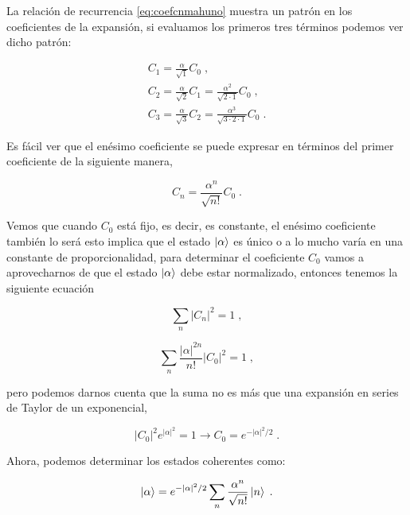     La relación de recurrencia \ref{eq:coefcnmahuno} muestra un patrón en los coeficientes de la expansión, si evaluamos los primeros tres términos podemos ver dicho patrón:

    \begin{align*}
        C_1 = \frac{\alpha}{\sqrt{1}}C_0\;,\\
        C_2 = \frac{\alpha}{\sqrt{2}}C_1 = \frac{\alpha^2}{\sqrt{2\cdot 1}}C_0\;,\\
        C_3 = \frac{\alpha}{\sqrt{3}}C_2 = \frac{\alpha^3}{\sqrt{3\cdot 2\cdot 1}}C_0\;.
    \end{align*}

    Es fácil ver que el enésimo coeficiente se puede expresar en términos del primer coeficiente de la siguiente manera,

    \begin{equation}
        C_n = \frac{\alpha^n}{\sqrt{n!}}C_0\;.
    \end{equation}

    Vemos que cuando $C_0$ está fijo, es decir, es constante, el enésimo coeficiente también lo será esto implica que el estado $\ket{\alpha}$ es único o a lo mucho varía en una constante de proporcionalidad, para determinar el coeficiente $C_0$ vamos a aprovecharnos de que el estado $\ket{\alpha}$ debe estar normalizado, entonces tenemos la siguiente ecuación 

    \begin{equation}
        \sum_n |C_n|^2 = 1\;,
    \end{equation}

    \begin{equation}
        \sum_n \frac{|\alpha|^{2n}}{n!}|C_0|^2 = 1\;,
    \end{equation}

    pero podemos darnos cuenta que la suma no es más que una expansión en series de Taylor de un exponencial,

    \begin{equation}
        |C_0|^2 e^{|\alpha|^2} = 1 \rightarrow C_0 = e^{-|\alpha|^2/2}\;.
    \end{equation}

    Ahora, podemos determinar los estados coherentes como:

    \begin{equation}\label{eq:CoherentStates}
        \ket{\alpha} = e^{-|\alpha|^2/2}\sum_n \frac{\alpha^n}{\sqrt{n!}}\ket{n}\;.
    \end{equation}

